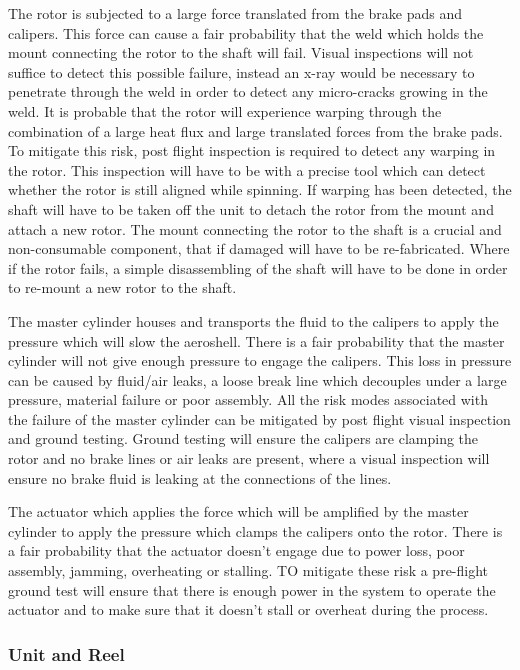 The rotor is subjected to a large force translated from the brake pads and calipers. This force can cause a fair probability that the weld which holds the mount connecting the rotor to the shaft will fail. Visual inspections will not suffice to detect this possible failure, instead an x-ray would be necessary to penetrate through the weld in order to detect any micro-cracks growing in the weld.  It is probable that the rotor will experience warping through the combination of a large heat flux and large translated forces from the brake pads. To mitigate this risk, post flight inspection is required to detect any warping in the rotor. This inspection will have to be with a precise tool which can detect whether the rotor is still aligned while spinning. If warping has been detected, the shaft will have to be taken off the unit to detach the rotor from the mount and attach a new rotor. The mount connecting the rotor to the shaft is a crucial and non-consumable component, that if damaged will have to be re-fabricated. Where if the rotor fails, a simple disassembling of the shaft will have to be done in order to re-mount a new rotor to the shaft. 

The master cylinder houses and transports the fluid to the calipers to apply the pressure which will slow the aeroshell. There is a fair probability that the master cylinder will not give enough pressure to engage the calipers. This loss in pressure can be caused by fluid/air leaks, a loose break line which decouples under a large pressure, material failure or poor assembly. All the risk modes associated with the failure of the master cylinder can be mitigated by post flight visual inspection and ground testing. Ground testing will ensure the calipers are clamping the rotor and no brake lines or air leaks are present, where a visual inspection will ensure no brake fluid is leaking at the connections of the lines. 

The actuator which applies the force which will be amplified by the master cylinder to apply the pressure which clamps the calipers onto the rotor. There is a fair probability that the actuator doesn't engage due to power loss, poor assembly, jamming, overheating or stalling. TO mitigate these risk a pre-flight ground test will ensure that there is enough power in the system to operate the actuator and to make sure that it doesn't stall or overheat during the process. 


\subsubsection{Unit and Reel}

